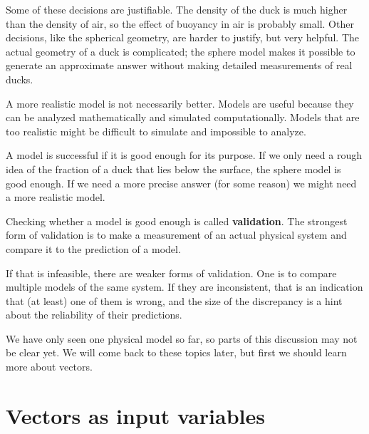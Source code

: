 \documentclass{book}
\begin{document}
Some of these decisions are justifiable. The density of the duck
is much higher than the density of air, so the effect of buoyancy
in air is probably small. Other decisions, like the spherical
geometry, are harder to justify, but very helpful. The actual
geometry of a duck is complicated; the sphere model makes it possible
to generate an approximate answer without making detailed measurements
of real ducks.

A more realistic model is not necessarily better. Models are useful
because they can be analyzed mathematically and simulated
computationally. Models that are too realistic might be difficult to
simulate and impossible to analyze.

A model is successful if it is good enough for its purpose. If we
only need a rough idea of the fraction of a duck that lies below
the surface, the sphere model is good enough. If we need a more
precise answer (for some reason) we might need a more realistic
model.



Checking whether a model is good enough is called {\bf validation}.
The strongest form of validation is to make a measurement of an
actual physical system and compare it to the prediction of a
model.

If that is infeasible, there are weaker forms of validation. One is
to compare multiple models of the same system. If they are
inconsistent, that is an indication that (at least) one of them is
wrong, and the size of the discrepancy is a hint about the reliability
of their predictions.

We have only seen one physical model so far, so parts of this
discussion may not be clear yet. We will come back to these topics
later, but first we should learn more about vectors.



\section{Vectors as input variables}
\end{document}
